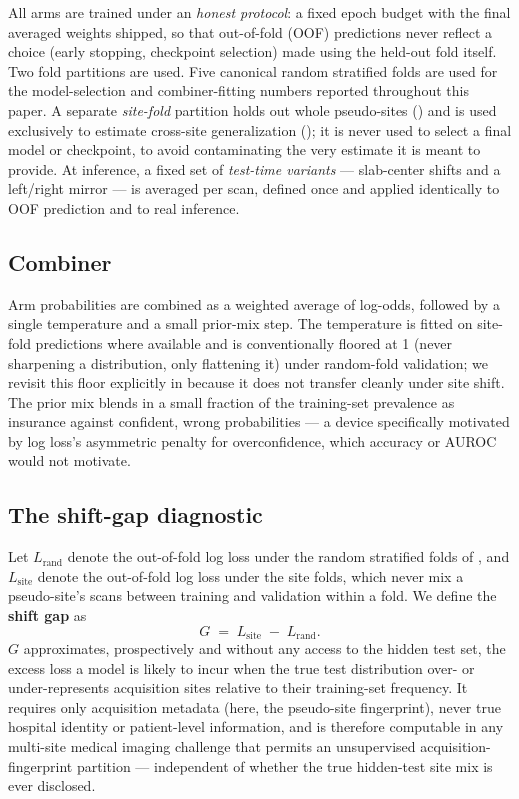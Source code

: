\documentclass[11pt]{article}
\newcommand{\shiftgap}{\ensuremath{G}}
\newcommand{\lrand}{\ensuremath{L_{\text{rand}}}}
\newcommand{\lsite}{\ensuremath{L_{\text{site}}}}
\begin{document}
All arms are trained under an \emph{honest protocol}: a fixed epoch budget with the final averaged weights shipped, so that out-of-fold (OOF) predictions never reflect a choice (early stopping, checkpoint selection) made using the held-out fold itself. Two fold partitions are used. Five canonical random stratified folds are used for the model-selection and combiner-fitting numbers reported throughout this paper. A separate \emph{site-fold} partition holds out whole pseudo-sites () and is used exclusively to estimate cross-site generalization (); it is never used to select a final model or checkpoint, to avoid contaminating the very estimate it is meant to provide. At inference, a fixed set of \emph{test-time variants} --- slab-center shifts and a left/right mirror --- is averaged per scan, defined once and applied identically to OOF prediction and to real inference.

\subsection{Combiner}
\label{sec:combiner}

Arm probabilities are combined as a weighted average of log-odds, followed by a single temperature and a small prior-mix step. The temperature is fitted on site-fold predictions where available and is conventionally floored at 1 (never sharpening a distribution, only flattening it) under random-fold validation; we revisit this floor explicitly in  because it does not transfer cleanly under site shift. The prior mix blends in a small fraction of the training-set prevalence as insurance against confident, wrong probabilities --- a device specifically motivated by log loss's asymmetric penalty for overconfidence, which accuracy or AUROC would not motivate.

\subsection{The shift-gap diagnostic}
\label{sec:shiftgap}

Let \lrand{} denote the out-of-fold log loss under the random stratified folds of , and \lsite{} denote the out-of-fold log loss under the site folds, which never mix a pseudo-site's scans between training and validation within a fold. We define the \textbf{shift gap} as
\begin{equation}
\shiftgap \;=\; \lsite \;-\; \lrand.
\label{eq:shiftgap}
\end{equation}
\shiftgap{} approximates, prospectively and without any access to the hidden test set, the excess loss a model is likely to incur when the true test distribution over- or under-represents acquisition sites relative to their training-set frequency. It requires only acquisition metadata (here, the pseudo-site fingerprint), never true hospital identity or patient-level information, and is therefore computable in any multi-site medical imaging challenge that permits an unsupervised acquisition-fingerprint partition --- independent of whether the true hidden-test site mix is ever disclosed.
\end{document}
